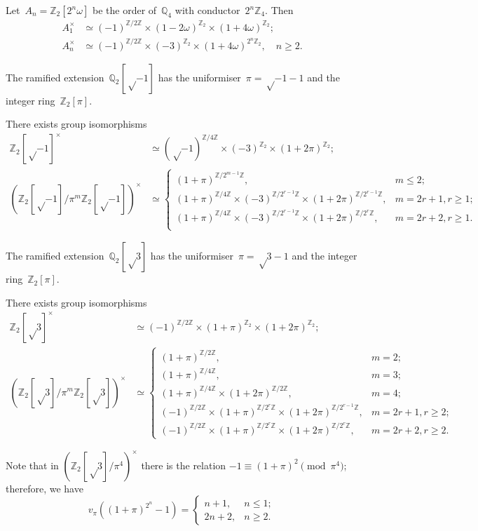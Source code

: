 \documentclass{article}
\begin{document}
\begin{prop}
Let~$A_n = ℤ_2[2^n ω]$ be the order of~$ℚ_4$ with conductor~$2^n ℤ_4$.
Then
\begin{align*}
A_1^{×} &≃ (-1)^{ℤ/2ℤ} × (1-2ω)^{ℤ_2} × (1 + 4 ω)^{ℤ_2};\\
A_n^{×} &≃ (-1)^{ℤ/2ℤ} × (-3)^{ℤ_2} × (1+4ω)^{2^n ℤ_2},\quad n ≥ 2.
\end{align*}
\end{prop}


The ramified extension~$ℚ_2[√{-1}]$ has the uniformiser~$π = √{-1}-1$ and
the integer ring~$ℤ_2[π]$. 
\begin{prop}
There exists group isomorphisms
\begin{align*}
ℤ_2[√{-1}]^{×} &≃ (√{-1})^{ℤ/4ℤ} × (-3)^{ℤ_2} × (1+2π)^{ℤ_2};\\
(ℤ_2[√{-1}]/π^m ℤ_2[√{-1}])^{×} &≃\begin{cases}
(1+π)^{ℤ/2^{m-1}ℤ},&m ≤ 2;\\
(1+π)^{ℤ/4ℤ} ×(-3)^{ℤ/2^{r-1} ℤ} ×(1+2π)^{ℤ/2^{r-1}ℤ},&m=2r+1,r ≥ 1;\\
(1+π)^{ℤ/4ℤ} ×(-3)^{ℤ/2^{r-1} ℤ} ×(1+2π)^{ℤ/2^{r}ℤ},&m=2r+2,r ≥ 1.\\
\end{cases}\end{align*}
\end{prop}

The ramified extension~$ℚ_2[√{3}]$ has the uniformiser~$π = √{3}-1$ and
the integer ring~$ℤ_2[π]$.
\begin{prop}
There exists group isomorphisms
\begin{align*}
ℤ_2[√{3}]^{×} &≃ (-1)^{ℤ/2ℤ} × (1+π)^{ℤ_2} × (1+2π)^{ℤ_2};\\
(ℤ_2[√{3}]/π^m ℤ_2[√{3}])^{×} &≃\begin{cases}
(1+π)^{ℤ/2ℤ},&m = 2;\\
(1+π)^{ℤ/4ℤ},&m = 3;\\
(1+π)^{ℤ/4ℤ} × (1+2π)^{ℤ/2ℤ},&m = 4;\\
(-1)^{ℤ/2ℤ} × (1+π)^{ℤ/2^rℤ} × (1+2π)^{ℤ/2^{r-1} ℤ},&m = 2r+1, r ≥ 2;\\
(-1)^{ℤ/2ℤ} × (1+π)^{ℤ/2^r ℤ} × (1+2π)^{ℤ/2^r ℤ},&m = 2r+2, r ≥ 2.
\end{cases}
\end{align*}
\end{prop}

Note that in $(ℤ_2[√{3}]/π^4)^{×}$ there is the relation $-1 ≡ (1+π)^2
\pmod{π^4}$; therefore, we have
\begin{equation}
v_{π} ((1+π)^{2^n} - 1) = \begin{cases}n+1,& n ≤ 1;\\2n+2,&n ≥ 2. \end{cases}
\end{equation}
\end{document}
